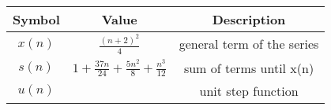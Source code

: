 \begin{tabular}{|c|c|c|}
    \hline
    	\textbf{Symbol} & \textbf{Value} & \textbf{Description} \\
    \hline
	  $x(n)$ & $\frac{(n+2)^2}{4}$ & general term of the series \\
    \hline
    	  $s(n)$ & $1 + \frac{37n}{24} + \frac{5n^2}{8} + \frac{n^3}{12}$ & sum of terms until x(n) \\
    \hline
	  $u(n)$ & & unit step function \\
    \hline
  \end{tabular}
